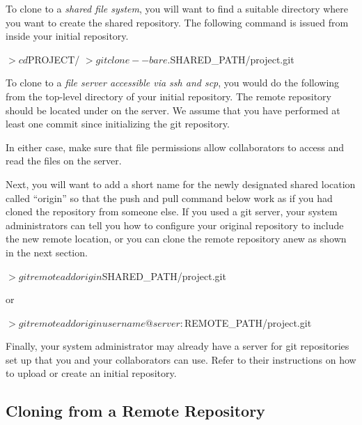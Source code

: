 To clone to a \textit{shared file system}, you will want to find a suitable directory  where you want to create the shared repository. The following command is issued from inside your initial repository.

\begin{CodeVerbatim}
$> cd $PROJECT/
$> git clone --bare . $SHARED_PATH/project.git
\end{CodeVerbatim}

To clone to a \textit{file server accessible via ssh and scp}, you would do the following from the top-level directory of your initial repository. The remote repository should be located under  on the server.  We assume that you have performed at least one commit since initializing the git repository.

In either case, make sure that file permissions allow collaborators to access and read the files on the server.

Next, you will want to add a short name for the newly designated shared location called ``origin'' so that the push and pull command below work as if you had cloned the repository from someone else.  If you used a git server, your system administrators can tell you how to configure your original repository to include the new remote location, or you can clone the remote repository anew as shown in the next section.
\begin{CodeVerbatim}
$> git remote add origin $SHARED_PATH/project.git
\end{CodeVerbatim}
or
\begin{CodeVerbatim}
$> git remote add origin username@server:$REMOTE_PATH/project.git
\end{CodeVerbatim}

Finally, your system administrator may already have a server for git repositories set up that you and your collaborators can use.  Refer to their instructions on how to upload or create an initial repository.

\subsection{Cloning from a Remote Repository}


